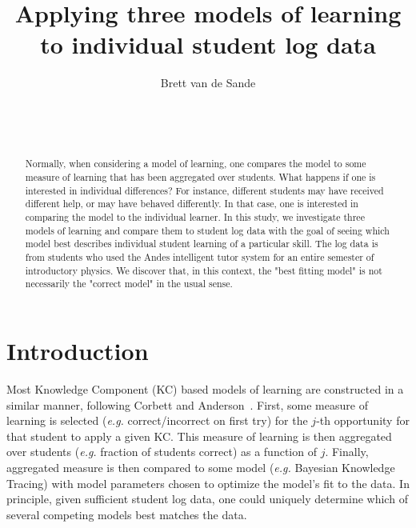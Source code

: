 \documentclass{edm_template}
\begin{document}
\title{Applying three models of learning to individual student log data}
\author{
\alignauthor
      Brett van de Sande\\
       \\
       \\
       \\
}

\maketitle
\begin{abstract}
Normally, when considering a model of learning, one compares the model
to some measure of learning that has been aggregated over students.
What happens if one is interested in individual differences?  For
instance, different students may have received different help, or may
have behaved differently.  In that case, one is interested in
comparing the model to the individual learner.  In this study, we
investigate three models of learning and compare them to student log
data with the goal of seeing which model best describes individual
student learning of a particular skill.  The log data is from students
who used the Andes intelligent tutor system for an entire semester of
introductory physics.  We discover that, in this context, the "best
fitting model" is not necessarily the "correct model" in the usual
sense.
\end{abstract}



\section{Introduction}


Most Knowledge Component (KC) \cite{vanlehn_behavior_2006}
based models of learning are constructed
in a similar manner, following Corbett and Anderson~\citeyear{corbett_knowledge_1995}.
First, some measure of learning is selected ({\em e.g.} correct/incorrect
on first try) for the $j$-th opportunity for that student to apply a given KC.  
This measure of learning is then aggregated over students 
({\em e.g.} fraction of students correct) as a function of $j$.
Finally, aggregated measure is then compared to some model
({\em e.g.} Bayesian Knowledge Tracing) with model parameters
chosen to optimize the model's fit to the data.
In principle, given sufficient student log data, one could uniquely
determine which of several competing models best matches the
data.
\end{document}
